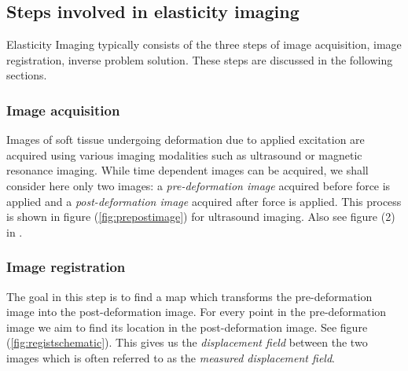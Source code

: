 \documentclass[10pt]{article}
\begin{document}
\subsection{Steps involved in elasticity imaging}
Elasticity Imaging typically consists of the three steps of image acquisition, image registration, inverse problem solution. These steps are discussed in the following sections.
\subsubsection{Image acquisition} Images of soft tissue undergoing deformation due to applied excitation are acquired using various imaging modalities such as ultrasound or magnetic resonance imaging. While time dependent images can be acquired, we shall consider here only two images: a \textit{pre-deformation image} acquired before force is applied and a \textit{post-deformation image} acquired after force is applied. This process is shown in figure (\ref{fig:prepostimage}) for ultrasound imaging. Also see figure (2) in \cite{paper:konofagou2004}.
\subsubsection{Image registration} The goal in this step is to find a map which transforms the pre-deformation image into the post-deformation image. For every point in the pre-deformation image we aim to find its location in the post-deformation image. See figure (\ref{fig:registschematic}). This gives us the \textit{displacement field} between the two images which is often referred to as the \textit{measured displacement field}.
\end{document}
